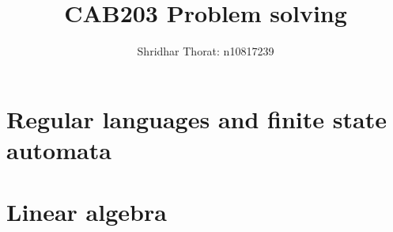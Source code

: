 \documentclass[a4paper]{article}
\author{Shridhar Thorat: n10817239}
\title{CAB203 Problem solving}
\begin{document}
\maketitle

\section{Regular languages and finite state automata}



\section{Linear algebra}
\end{document}
